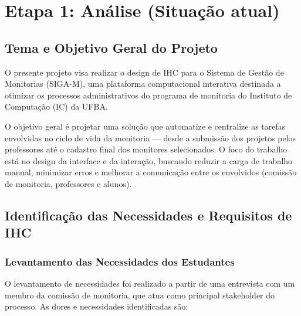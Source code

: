 \documentclass[12pt, a4paper]{report}
\begin{document}
\chapter{Etapa 1: Análise (Situação atual)}
\label{ch:analise}

\section{Tema e Objetivo Geral do Projeto}

O presente projeto visa realizar o design de IHC para o Sistema de Gestão de Monitorias (SIGA-M), uma plataforma computacional interativa destinada a otimizar os processos administrativos do programa de monitoria do Instituto de Computação (IC) da UFBA.

O objetivo geral é projetar uma solução que automatize e centralize as tarefas envolvidas no ciclo de vida da monitoria — desde a submissão dos projetos pelos professores até o cadastro final dos monitores selecionados. O foco do trabalho está no design da interface e da interação, buscando reduzir a carga de trabalho manual, minimizar erros e melhorar a comunicação entre os envolvidos (comissão de monitoria, professores e alunos).

\section{Identificação das Necessidades e Requisitos de IHC}

\subsection{Levantamento das Necessidades dos Estudantes}

O levantamento de necessidades foi realizado a partir de uma entrevista com um membro da comissão de monitoria, que atua como principal stakeholder do processo. As dores e necessidades identificadas são:
\end{document}
